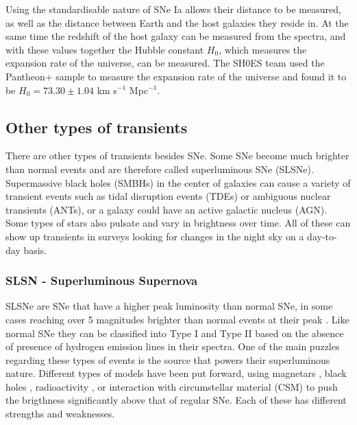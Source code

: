 \documentclass[a4paper,oneside,12pt, class=Latex/Classes/PhDthesisPSnPDF, crop=false]{standalone}
\begin{document}
Using the standardisable nature of SNe Ia allows their distance to be measured, as well as the distance between Earth and the host galaxies they reside in. At the same time the redshift of the host galaxy can be measured from the spectra, and with these values together the Hubble constant $H_0$, which measures the expansion rate of the universe, can be measured. The SH0ES team \citep{SH0ES} used the Pantheon+ sample \citep{Pantheon+} to measure the expansion rate of the universe and found it to be $H_0 = 73.30 \pm 1.04$ km s$^{-1}$ Mpc$^{-1}$.


\subsection{Other types of transients}
\label{Other_trans}
There are other types of transients besides SNe. Some SNe become much brighter than normal events and are therefore called superluminous SNe (SLSNe). Supermassive black holes (SMBHs) in the center of galaxies can cause a variety of transient events such as tidal disruption events (TDEs) or ambiguous nuclear transients (ANTs), or a galaxy could have an active galactic nucleus (AGN). Some types of stars also pulsate and vary in brightness over time. All of these can show up transients in surveys looking for changes in the night sky on a day-to-day basis.


\subsubsection{SLSN - Superluminous Supernova}
SLSNe are SNe that have a higher peak luminosity than normal SNe, in some cases reaching over 5 magnitudes brighter than normal events at their peak \citep{SLSN_Gal-Yam}. Like normal SNe they can be classified into Type I and Type II based on the absence of presence of hydrogen emission lines in their spectra. One of the main puzzles regarding these types of events is the source that powers their superluminous nature. Different types of models have been put forward, using magnetars \citep{Maeda_SLSN_magentar}, black holes \citep{SLSN_BH}, radioactivity \citep{Kasen_SLSN_pair_instab}, or interaction with circumstellar material (CSM) \citep{Late-time_CSM_SLSNE_I} to push the brigthness significantly above that of regular SNe. Each of these has different strengths and weaknesses.
\end{document}
